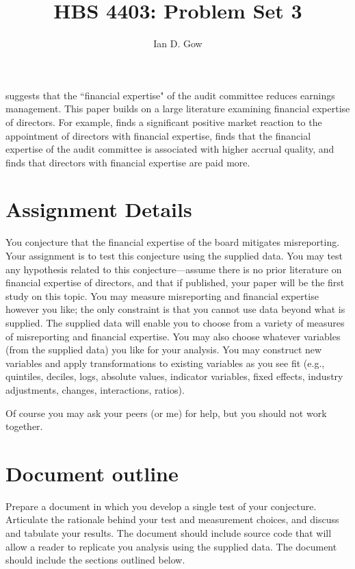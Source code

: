 \documentclass[11pt]{amsart}
\title[HBS 4403: Management Control and Performance Measurement]{HBS 4403: Problem Set 3}
\author{Ian D. Gow}
\theoremstyle{definition}
\theoremstyle{question}
\begin{document}
\usetikzlibrary{automata, shapes, calc, positioning}
\maketitle




\citet{Badolato:2014bw} suggests that the ``financial expertise" of the audit committee reduces earnings management. 
This paper builds on a large literature examining financial expertise of directors.
For example, \citet{DeFond:2005hs} finds a significant positive market reaction to the appointment of directors with financial expertise, \citet{Dhaliwal:2010bz} finds that the financial expertise of the audit committee is associated with higher accrual quality, and \citet{Engel:2010kv} finds that directors with financial expertise are paid more.

\section{Assignment Details}
You conjecture that the financial expertise of the board mitigates misreporting. 
Your assignment is to test this conjecture using the supplied data. 
You may test any hypothesis related to this conjecture---assume there is no prior literature on financial expertise of directors, and that if published, your paper will be the first study on this topic.
You may measure misreporting and financial expertise however you like; the only constraint is that you cannot use data beyond what is supplied. 
The supplied data will enable you to choose from a variety of measures of misreporting and financial expertise. 
You may also choose whatever variables (from the supplied data) you like for your analysis. 
You may construct new variables and apply transformations to existing variables as you see fit (e.g., quintiles, deciles, logs, absolute values, indicator variables, fixed effects, industry adjustments, changes, interactions, ratios). 

Of course you may ask your peers (or me) for help, but you should not work together.

\section{Document outline}
Prepare a document in which you develop a single test of your conjecture. 
Articulate the rationale behind your test and measurement choices, and discuss and tabulate your results. 
The document should include source code that will allow a reader to replicate you analysis using the supplied data.
The document should include the sections outlined below.
\end{document}
